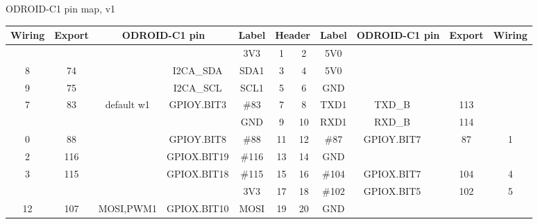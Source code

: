 \documentclass[a4paper,12pt]{article}
\newcommand{\thistitle}{ODROID-C1 pin map, v1}
\newcommand{\tFPWM}[1]{\textcolor{clPWM}{#1}}
\newcommand{\tFSPI}[1]{\textcolor{clSPI}{#1}}
\newcommand{\tFIIC}[1]{\textcolor{clIIC}{#1}}
\newcommand{\cheader}[1]{\sffamily\textbf{\textcolor{headercolor}{#1}}}
\newcommand{\sepline}{\cline{1-5}\cline{8-12}}
\newcommand{\cpwr}{\cellcolor{pwrcolor}}
\newcommand{\cgpio}{\cellcolor{gpiocolor}}
\newcommand{\cspc}{\cellcolor{specialcolor}}
\newcommand{\tfl}{\textendash}
\begin{document}
\begin{center}
\Huge{}\thistitle
\end{center}

\begin{center}
\ttfamily
\scriptsize
\begin{tabular}{ccccc|cc|ccccc}
\hline
\cheader{Wiring} & \cheader{Export} & \multicolumn{2}{c}{\cheader{ODROID-C1 pin}} & \cheader{Label} & \multicolumn{2}{|c|}{\cheader{Header}} & \cheader{Label} & \multicolumn{2}{c}{\cheader{ODROID-C1 pin}} & \cheader{Export} & \cheader{Wiring}\\
\hline
\hline
 \tfl  & \tfl   &                 & \tfl           & 3V3   & \cpwr{}1      & \cpwr{}2     & 5V0   & \tfl           &                 & \tfl   & \tfl    \\
 8     & 74     &                 & \tFIIC{I2CA\_SDA}      & SDA1  & \cspc{}3      & \cpwr{}4     & 5V0   & \tfl           &                 & \tfl   & \tfl    \\
 9     & 75     &                 & \tFIIC{I2CA\_SCL}      & SCL1  & \cspc{}5      & \cpwr{}6     & GND   & \tfl           &                 & \tfl   & \tfl    \\
 7     & 83     & default w1      & GPIOY.BIT3     & \#83  & \cgpio{}7     & \cgpio{}8    & TXD1  & TXD\_B         &                 & 113    & \tfl    \\
 \tfl  & \tfl   &                 & \tfl           & GND   & \cpwr{}9      & \cgpio{}10   & RXD1  & RXD\_B         &                 & 114    & \tfl    \\
\sepline
 0     & 88     &                 & GPIOY.BIT8     & \#88  & \cgpio{}11    & \cgpio{}12   & \#87  & GPIOY.BIT7     &                 & 87     & 1     \\
 2     & 116    &                 & GPIOX.BIT19    & \#116 & \cgpio{}13    & \cpwr{}14    & GND   & \tfl           &                 & \tfl   & \tfl    \\
 3     & 115    &                 & GPIOX.BIT18    & \#115 & \cgpio{}15    & \cgpio{}16   & \#104 & GPIOX.BIT7     &                 & 104    & 4     \\
 \tfl  & \tfl   &                 & \tfl           & 3V3   & \cpwr{}17     & \cgpio{}18   & \#102 & GPIOX.BIT5     &                 & 102    & 5     \\
 12    & 107    & \tFSPI{MOSI},\tFPWM{PWM1} & GPIOX.BIT10    & MOSI  & \cgpio{}19    & \cpwr{}20    & GND   & \tfl           &                 & \tfl   & \tfl    \\

\end{tabular}
\end{center}
\end{document}
